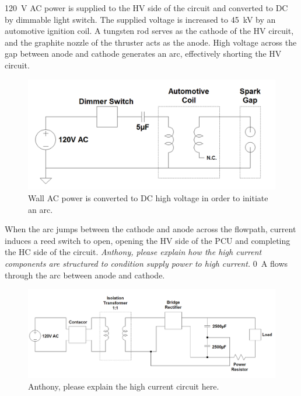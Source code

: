 \documentclass[journal]{IEEEtran}
\begin{document}
\SI{120}{\volt} AC power is supplied to the HV side of the circuit and converted to DC by dimmable light switch.
The supplied voltage is increased to \SI{45}{\kilo\volt} by an automotive ignition coil.
A tungsten rod serves as the cathode of the HV circuit, and the graphite nozzle of the thruster acts as the anode.
High voltage across the gap between anode and cathode generates an arc, effectively shorting the HV circuit.

\begin{figure}[htp]
  \includegraphics[width=\linewidth]{figs/hv-schematic.png}
  \caption{Wall AC power is converted to DC high voltage in order to initiate an arc.
\label{fig:hv-circuit}
}
\end{figure}

When the arc jumps between the cathode and anode across the flowpath, current induces a reed switch to open, opening the HV side of the PCU and completing the HC side of the circuit.
\emph{Anthony, please explain how the high current components are structured to condition supply power to high current.}
\SI{0}{\ampere} flows through the arc between anode and cathode.

\begin{figure}[htp]
  \includegraphics[width=\linewidth]{figs/hc-schematic.png}
  \caption{Anthony, please explain the high current circuit here.
\label{fig:hc-circuit}
}
\end{figure}
\end{document}
